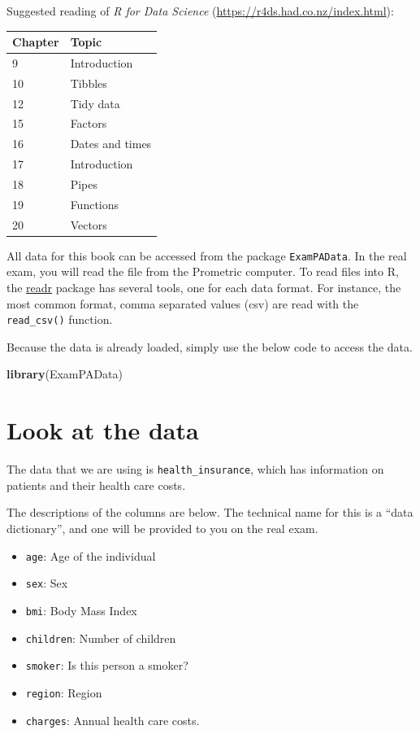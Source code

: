 \documentclass[]{book}
\newenvironment{Shaded}{\begin{snugshade}}{\end{snugshade}}
\newcommand{\KeywordTok}[1]{\textcolor[rgb]{0.13,0.29,0.53}{\textbf{#1}}}
\newcommand{\NormalTok}[1]{#1}
\providecommand{\tightlist}{%
  \setlength{\itemsep}{0pt}\setlength{\parskip}{0pt}}
\begin{document}
Suggested reading of \emph{R for Data Science} (\url{https://r4ds.had.co.nz/index.html}):

\begin{longtable}[]{@{}ll@{}}
\toprule
Chapter & Topic\tabularnewline
\midrule
\endhead
9 & Introduction\tabularnewline
10 & Tibbles\tabularnewline
12 & Tidy data\tabularnewline
15 & Factors\tabularnewline
16 & Dates and times\tabularnewline
17 & Introduction\tabularnewline
18 & Pipes\tabularnewline
19 & Functions\tabularnewline
20 & Vectors\tabularnewline
\bottomrule
\end{longtable}

All data for this book can be accessed from the package \texttt{ExamPAData}. In the real exam, you will read the file from the Prometric computer. To read files into R, the \href{https://readr.tidyverse.org/articles/readr.html}{readr} package has several tools, one for each data format. For instance, the most common format, comma separated values (csv) are read with the \texttt{read\_csv()} function.

Because the data is already loaded, simply use the below code to access the data.

\begin{Shaded}
\begin{Highlighting}[]
\KeywordTok{library}\NormalTok{(ExamPAData)}
\end{Highlighting}
\end{Shaded}

\hypertarget{look-at-the-data}{%
\section{Look at the data}\label{look-at-the-data}}

The data that we are using is \texttt{health\_insurance}, which has information on patients and their health care costs.

The descriptions of the columns are below. The technical name for this is a ``data dictionary'', and one will be provided to you on the real exam.

\begin{itemize}
\tightlist
\item
  \texttt{age}: Age of the individual
\item
  \texttt{sex}: Sex
\item
  \texttt{bmi}: Body Mass Index
\item
  \texttt{children}: Number of children
\item
  \texttt{smoker}: Is this person a smoker?
\item
  \texttt{region}: Region
\item
  \texttt{charges}: Annual health care costs.
\end{itemize}
\end{document}
